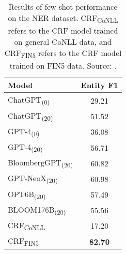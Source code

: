\begin{table}[!h]
	\centering
	\begin{tabularx}{0.8\textwidth}{Xc}
		\toprule
		\textbf{Model}                   & \textbf{Entity F1} \\
		\midrule
		ChatGPT\textsubscript{(0)}       & 29.21              \\
		ChatGPT\textsubscript{(20)}      & 51.52              \\
		GPT-4\textsubscript{(0)}         & 36.08              \\
		GPT-4\textsubscript{(20)}        & 56.71              \\
		BloombergGPT\textsubscript{(20)} & 60.82              \\
		GPT-NeoX\textsubscript{(20)}     & 60.98              \\
		OPT6B\textsubscript{(20)}        & 57.49              \\
		BLOOM176B\textsubscript{(20)}    & 55.56              \\
		CRF\textsubscript{CoNLL}         & 17.20              \\
		CRF\textsubscript{FIN5}          & \textbf{82.70}     \\
		\bottomrule
	\end{tabularx}
	\caption{Results of few-shot performance on the NER dataset. CRF\textsubscript{CoNLL} refers to the CRF model trained on general CoNLL data, and CRF\textsubscript{FIN5} refers to the CRF model trained on FIN5 data. Source: \textcite{li2023chatgpt}.}
	\label{tab:ner_few_shot_performance}
\end{table}

